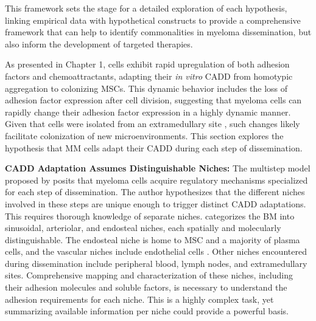 This framework sets the stage for a detailed exploration of each hypothesis,
linking empirical data with hypothetical constructs to provide a comprehensive
framework that can help to identify commonalities in myeloma dissemination, but
also inform the development of targeted therapies.




\unnsubsection{\caddadaptationtitle}%
\label{sec:discussion_caddadaptation}%
As presented in Chapter 1, \MAina cells exhibit rapid upregulation of both
adhesion factors and chemoattractants, adapting their \textit{in vitro}
\ac{CADD} from homotypic aggregation to colonizing \acp{MSC}. This dynamic
behavior includes the loss of adhesion factor expression after cell division,
suggesting that myeloma cells can rapidly change their adhesion factor
expression in a highly dynamic manner. Given that \INA cells were isolated from
an extramedullary site , such changes likely facilitate
colonization of new microenvironments. This section explores the hypothesis that
MM cells adapt their \ac{CADD} during each step of dissemination.



\textbf{\ac{CADD} Adaptation Assumes Distinguishable Niches:} The multistep
model proposed by \citet{zeissigTumourDisseminationMultiple2020} posits that
myeloma cells acquire regulatory mechanisms specialized for each step of
dissemination. The author hypothesizes that the different niches involved in
these steps are unique enough to trigger distinct \ac{CADD} adaptations. This
requires thorough knowledge of separate niches.
\citet{granataBoneMarrowNiches2022} categorizes the \ac{BM} into sinusoidal,
arteriolar, and endosteal niches, each spatially and molecularly
distinguishable. The endosteal niche is home to \ac{MSC} and a majority of
plasma cells, and the vascular niches
 include endothelial cells
\cite{zehentmeierStaticDynamicComponents2014, wilmoreHereThereAnywhere2017}.
Other niches encountered during dissemination include peripheral blood, lymph
nodes, and extramedullary sites. Comprehensive mapping and characterization of
these niches, including their adhesion molecules and soluble factors, is
necessary to understand the adhesion requirements for each niche. This is a
highly complex task, yet summarizing available information per niche could
provide a powerful basis.


